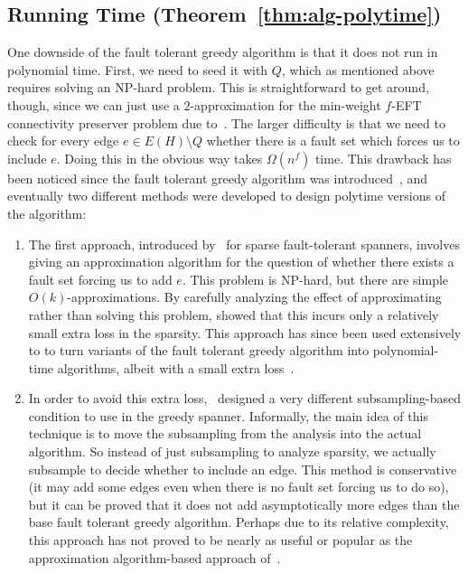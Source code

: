 \documentclass{article}
\theoremstyle{plain}
\theoremstyle{definition}
\begin{document}
\subsection{Running Time (Theorem~\ref{thm:alg-polytime})} \label{sec:running-time-overview}
One downside of the fault tolerant greedy algorithm is that it does not run in polynomial time.  First, we need to seed it with $Q$, which as mentioned above requires solving an NP-hard problem.  This is straightforward to get around, though, since we can just use a $2$-approximation for the min-weight $f$-EFT connectivity preserver problem due to~\cite{DKK22,DKKN23}.  The larger difficulty is that we need to check for every edge $e \in E(H) \setminus Q$ whether there is a fault set which forces us to include $e$.  Doing this in the obvious way takes $\Omega(n^f)$ time.  This drawback has been noticed since the fault tolerant greedy algorithm was introduced~\cite{BDPV18}, and eventually two different methods were developed to design polytime versions of the algorithm:
\begin{enumerate}
    \item The first approach, introduced by~\cite{DR20} for sparse fault-tolerant spanners, involves giving an approximation algorithm for the question of whether there exists a fault set forcing us to add $e$.  This problem is NP-hard, but there are simple $O(k)$-approximations.  By carefully analyzing the effect of approximating rather than solving this problem, \cite{DR20} showed that this incurs only a relatively small extra loss in the sparsity.  This approach has since been used extensively to to turn variants of the fault tolerant greedy algorithm into polynomial-time algorithms, albeit with a small extra loss~\cite{BDR22,BDN22,BDN23,BHP24,PST24}.
    
    \item In order to avoid this extra loss,~\cite{BDR21} designed a very different subsampling-based condition to use in the greedy spanner.  Informally, the main idea of this technique is to move the subsampling from the analysis into the actual algorithm.  So instead of just subsampling to analyze sparsity, we actually subsample to decide whether to include an edge.     This method is conservative (it may add some edges even when there is no fault set forcing us to do so), but it can be proved that it does not add asymptotically more edges than the base fault tolerant greedy algorithm.  Perhaps due to its relative complexity, this approach has not proved to be nearly as useful or popular as the approximation algorithm-based approach of~\cite{DR20}.
\end{enumerate}
\end{document}
